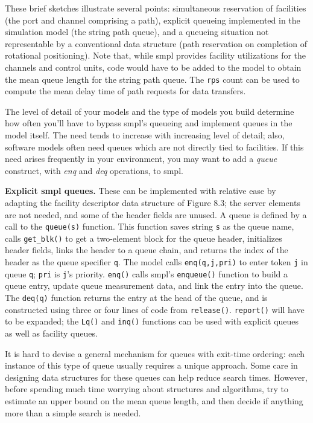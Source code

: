 These brief sketches illustrate several points: simultaneous reservation
of facilities (the port and channel comprising a path), explicit queueing
implemented in the simulation model (the string path queue), and a queueing
situation not representable by a conventional data structure (path reservation
on completion of rotational positioning). Note that, while smpl provides
facility utilizations for the channels and control units, code would
have to be added to the model to obtain the mean queue length for the string
path queue. The \texttt{rps} count can be used to compute the mean delay time of
path requests for data transfers.

The level of detail of your models and the type of models you build
determine how often you'll have to bypass smpl's queueing and implement
queues in the model itself. The need tends to increase with increasing level
of detail; also, software models often need queues which are not directly
tied to facilities. If this need arises frequently in your environment, you may
want to add a \emph{queue} construct, with \emph{enq} and \emph{deq} operations, to smpl.

\textbf{Explicit smpl queues.} These can be implemented with relative ease by
adapting the facility descriptor data structure of Figure 8.3; the server
elements are not needed, and some of the header fields are unused. A queue is
defined by a call to the \texttt{queue(s)} function. This function saves string \texttt{s} as
the queue name, calls \texttt{get\_blk()} to get a two-element block for the queue
header, initializes header fields, links the header to a queue chain, and
returns the index of the header as the queue specifier \texttt{q}. The model calls
\texttt{enq(q,j,pri)} to enter token \texttt{j} in queue \texttt{q}; \texttt{pri} is \texttt{j}'s priority. \texttt{enq()} calls
smpl's \texttt{enqueue()} function to build a queue entry, update queue measurement
data, and link the entry into the queue. The \texttt{deq(q)} function returns the
entry at the head of the queue, and is constructed using three or four lines of
code from \texttt{release()}. \texttt{report()} will have to be expanded; the \texttt{Lq()} and
\texttt{inq()} functions can be used with explicit queues as well as facility queues.

It is hard to devise a general mechanism for queues with exit-time
ordering: each instance of this type of queue usually requires a unique
approach. Some care in designing data structures for these queues can help
\noindent reduce search times. However, before spending much time worrying about
structures and algorithms, try to estimate an upper bound on the mean queue
length, and then decide if anything more than a simple search is needed.

